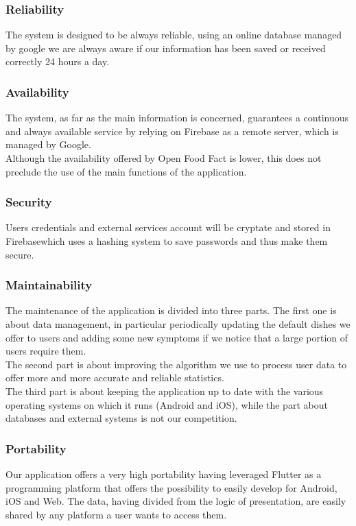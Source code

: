 \documentclass [12pt]{article}
\begin{document}
\subsubsection{Reliability}
The system is designed to be always reliable, using an online database managed by google we are always aware if our information has been saved or received correctly 24 hours a day.

\subsubsection{Availability}
The system, as far as the main information is concerned, guarantees a continuous and always available service by relying on Firebase as a remote server, which is managed by Google.\\
Although the availability offered by Open Food Fact is lower, this does not preclude the use of the main functions of the application.

\subsubsection{Security}
Users credentials and external services account will be cryptate and stored in Firebasewhich uses a hashing system to save passwords and thus make them secure.

\subsubsection{Maintainability}
The maintenance of the application is divided into three parts.
The first one is about data management, in particular periodically updating the default dishes we offer to users and adding some new symptoms if we notice that a large portion of users require them.\\
The second part is about improving the algorithm we use to process user data to offer more and more accurate and reliable statistics.\\
The third part is about keeping the application up to date with the various operating systems on which it runs (Android and iOS), while the part about databases and external systems is not our competition.
\subsubsection{Portability}
Our application offers a very high portability having leveraged Flutter as a programming platform that offers the possibility to easily develop for Android, iOS and Web.
The data, having divided from the logic of presentation,  are easily shared by any platform a user wants to access them.
\end{document}
